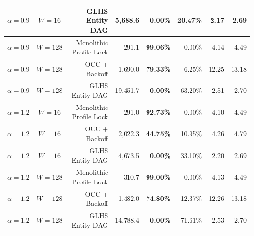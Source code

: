 \begin{table}[t]
\begin{tabular}{lcrrrrrr}
$\alpha = 0.9$ & $W = 16$ & GLHS Entity DAG & 5,688.6 & \textbf{0.00\%} & 20.47\% & 2.17 & 2.69 \\
\midrule
$\alpha = 0.9$ & $W = 128$ & Monolithic Profile Lock & 291.1 & \textbf{99.06\%} & 0.00\% & 4.14 & 4.49 \\
$\alpha = 0.9$ & $W = 128$ & OCC + Backoff & 1,690.0 & \textbf{79.33\%} & 6.25\% & 12.25 & 13.18 \\
$\alpha = 0.9$ & $W = 128$ & GLHS Entity DAG & 19,451.7 & \textbf{0.00\%} & 63.20\% & 2.51 & 2.70 \\
\midrule
$\alpha = 1.2$ & $W = 16$ & Monolithic Profile Lock & 291.0 & \textbf{92.73\%} & 0.00\% & 4.10 & 4.49 \\
$\alpha = 1.2$ & $W = 16$ & OCC + Backoff & 2,022.3 & \textbf{44.75\%} & 10.95\% & 4.26 & 4.79 \\
$\alpha = 1.2$ & $W = 16$ & GLHS Entity DAG & 4,673.5 & \textbf{0.00\%} & 33.10\% & 2.20 & 2.69 \\
\midrule
$\alpha = 1.2$ & $W = 128$ & Monolithic Profile Lock & 310.7 & \textbf{99.00\%} & 0.00\% & 4.13 & 4.49 \\
$\alpha = 1.2$ & $W = 128$ & OCC + Backoff & 1,482.0 & \textbf{74.80\%} & 12.37\% & 12.26 & 13.18 \\
$\alpha = 1.2$ & $W = 128$ & GLHS Entity DAG & 14,788.4 & \textbf{0.00\%} & 71.61\% & 2.53 & 2.70 \\
\bottomrule
\end{tabular}
\end{table}